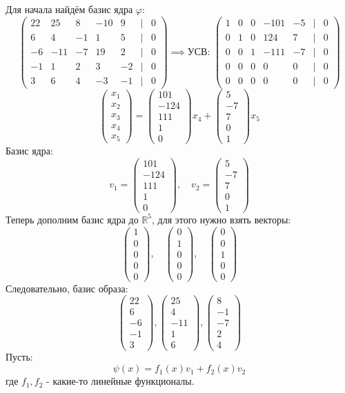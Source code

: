 \documentclass[a4paper]{article}
\newcommand{\mat}[1]{\begin{pmatrix} #1 \end{pmatrix}}
\renewcommand{\phi}{\varphi}
\newcommand{\RR}{\mathbb{R}}
\begin{document}
\begin{enumerate}
    Для начала найдём базис ядра $\phi$:
    $$\mat{22 & 25 & 8 & -10 & 9 &|&0\\
        6 & 4 & -1 & 1 & 5 &|&0\\
        -6 & -11 & -7 & 19 & 2 &|&0\\
        -1 & 1 & 2 & 3 & -2&|&0 \\
        3 & 6 & 4 & -3 & -1&|&0} \implies \text{УСВ: } 
    \mat{1 & 0 & 0 & -101 & -5 & | & 0 \\
        0 & 1 & 0 & 124 & 7 & | & 0 \\
        0 & 0 & 1 & -111 & -7 & | & 0 \\
        0 & 0 & 0 & 0 & 0 & | & 0 \\
        0 & 0 & 0 & 0 & 0 & | & 0}$$
    $$\mat{x_1\\x_2\\x_3\\x_4\\x_5} = \mat{101\\-124\\111\\1\\0}x_4 + \mat{5\\-7\\7\\0\\1}x_5$$  
    Базис ядра:
    $$v_1 = \mat{101\\-124\\111\\1\\0}, \quad v_2 = \mat{5\\-7\\7\\0\\1}$$
    Теперь дополним базис ядра до $\RR^5$, для этого нужно взять векторы:
    $$\mat{1\\0\\0\\0\\0}, \quad \mat{0\\1\\0\\0\\0}, \quad \mat{0\\0\\1\\0\\0}$$
    Следовательно, базис образа:
    $$\mat{22\\6\\-6\\-1\\3}, \mat{25\\4\\-11\\1\\6}, \mat{8\\-1\\-7\\2\\4}$$
    Пусть:
    $$\psi(x) = f_1(x)v_1 + f_2(x)v_2$$
    где $f_1, f_2$ - какие-то линейные функционалы.


\end{enumerate}
\end{document}
